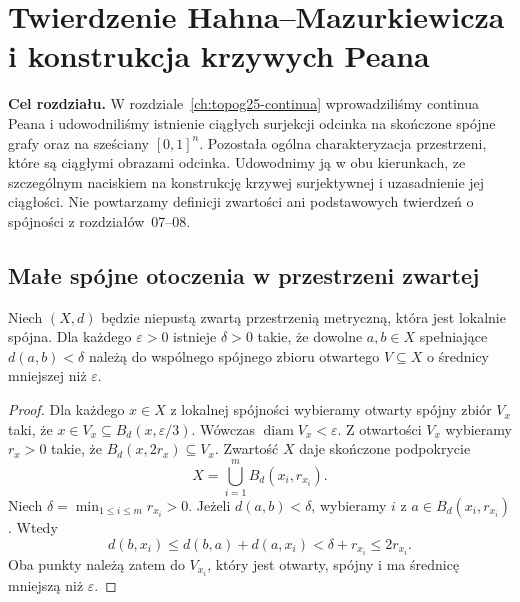 \chapter{Twierdzenie Hahna--Mazurkiewicza i konstrukcja krzywych Peana}
\label{ch:topog26-hahn-mazurkiewicz}

\noindent\textbf{Cel rozdziału.}
W rozdziale~\ref{ch:topog25-continua} wprowadziliśmy
continua Peana i udowodniliśmy istnienie ciągłych
surjekcji odcinka na skończone spójne grafy
oraz na sześciany \([0,1]^n\).
Pozostała ogólna charakteryzacja przestrzeni,
które są ciągłymi obrazami odcinka.
Udowodnimy ją w obu kierunkach,
ze szczególnym naciskiem na konstrukcję
krzywej surjektywnej i uzasadnienie jej ciągłości.
Nie powtarzamy definicji zwartości ani
podstawowych twierdzeń o spójności
z rozdziałów~07--08.

\section{Małe spójne otoczenia w przestrzeni zwartej}
\label{sec:topog26-uniform-connected}

\begin{lemat}
\label{lem:topog26-uniform-local-connected}
Niech \((X,d)\) będzie niepustą zwartą
przestrzenią metryczną, która jest lokalnie spójna.
Dla każdego \(\varepsilon>0\) istnieje
\(\delta>0\) takie, że dowolne
\(a,b\in X\) spełniające \(d(a,b)<\delta\)
należą do wspólnego spójnego
zbioru otwartego \(V\subseteq X\)
o średnicy mniejszej niż \(\varepsilon\).
\end{lemat}
\begin{proof}
Dla każdego \(x\in X\) z lokalnej spójności
wybieramy otwarty spójny zbiór
\(V_x\) taki, że
\(x\in V_x\subseteq B_d(x,\varepsilon/3)\).
Wówczas \(\operatorname{diam}V_x<\varepsilon\).
Z otwartości \(V_x\) wybieramy \(r_x>0\)
takie, że \(B_d(x,2r_x)\subseteq V_x\).
Zwartość \(X\) daje skończone
podpokrycie
\[
 X=\bigcup_{i=1}^{m}B_d(x_i,r_{x_i}).
\]
Niech \(\delta=\min_{1\le i\le m}r_{x_i}>0\).
Jeżeli \(d(a,b)<\delta\), wybieramy
\(i\) z \(a\in B_d(x_i,r_{x_i})\).
Wtedy
\[
 d(b,x_i)\le d(b,a)+d(a,x_i)
       <\delta+r_{x_i}\le2r_{x_i}.
\]
Oba punkty należą zatem do \(V_{x_i}\),
który jest otwarty, spójny
i ma średnicę mniejszą niż \(\varepsilon\).
\end{proof}

